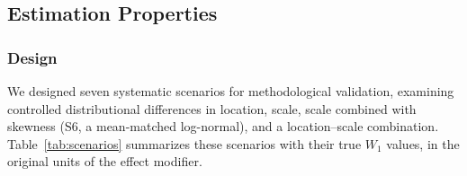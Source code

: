 \documentclass[AMA,Times1COL]{WileyNJDv5}
\begin{document}

\subsection{Estimation Properties}\label{sec:study2}


\subsubsection{Design}\label{sec:sim_design}

We designed seven systematic scenarios for methodological validation, examining controlled distributional differences in location, scale, scale combined with skewness (S6, a mean-matched log-normal), and a location--scale combination. Table~\ref{tab:scenarios} summarizes these scenarios with their true $W_1$ values, in the original units of the effect modifier.
\end{document}
